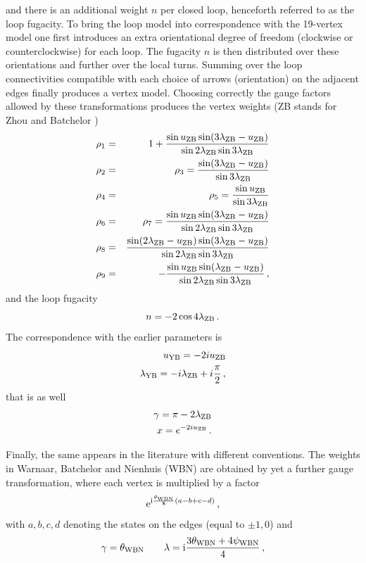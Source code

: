 \documentclass[11pt]{article}
\begin{document}
%
and there is an additional weight $n$ per closed loop, henceforth referred to as the loop fugacity. To bring the loop model into correspondence with the 19-vertex model one first introduces an extra orientational degree of freedom (clockwise or counterclockwise) for each loop. The fugacity $n$ is then distributed over these orientations and further over the local turns. Summing over the loop connectivities compatible with each choice of arrows (orientation) on the adjacent edges finally produces a vertex model. Choosing correctly the gauge factors allowed by these transformations produces the vertex weights (ZB stands for Zhou and Batchelor \cite{Batchelor})
%
\begin{eqnarray}
\rho_1&=&1+{\sin u_{\rm ZB} \sin(3\lambda_{\rm ZB}-u_{\rm ZB})
\over \sin2\lambda_{\rm ZB}\sin3\lambda_{\rm ZB}}\nonumber\\
\rho_2&=&\rho_3={\sin(3\lambda_{\rm ZB}-u_{\rm ZB})\over\sin 3\lambda_{\rm ZB}}\nonumber\\
\rho_4&=&\rho_5={\sin u_{\rm ZB} \over\sin3\lambda_{\rm ZB}}\nonumber\\
\rho_6&=&\rho_7={\sin u_{\rm ZB}\sin(3\lambda_{\rm ZB}-u_{\rm ZB})\over \sin 2\lambda_{\rm ZB}\sin3\lambda_{\rm ZB}}\nonumber\\
\rho_8&=&{\sin(2\lambda_{\rm ZB}-u_{\rm ZB})\sin(3\lambda_{\rm ZB}-u_{\rm ZB})\over \sin 2\lambda_{\rm ZB}\sin3\lambda_{\rm ZB}}\nonumber\\
\rho_9&=&-{\sin u_{\rm ZB}\sin(\lambda_{\rm ZB}-u_{\rm ZB})\over \sin 2\lambda_{\rm ZB}\sin3\lambda_{\rm ZB}} \,,
\label{ZBweights}
\end{eqnarray}
%
and the loop fugacity
%
\begin{equation}
 n=-2\cos4\lambda_{\rm ZB} \,.
\end{equation}
%
The correspondence with the earlier parameters is
%
\begin{eqnarray}
u_{\rm YB}=-2iu_{\rm ZB}\nonumber\\
\lambda_{\rm YB}=-i\lambda_{\rm ZB}+i{\pi\over 2} \,,
\end{eqnarray}
%
that is as well
%
\begin{eqnarray}
\gamma=\pi-2\lambda_{\rm ZB}\nonumber\\
x=e^{-2iu_{\rm ZB}} \,.
\end{eqnarray}
%

Finally, the same  appears in the literature with different conventions. The weights in Warnaar, Batchelor and Nienhuis (WBN) \cite{Nienhuis} are obtained  by yet a further  gauge transformation, where each vertex is multiplied by a factor 
%
\begin{equation}
\mathrm{e}^{\mathrm{i}{\theta_{\rm WBN} \over 8} \left(a-b+c-d\right)}  \,,
\end{equation}
%
with $a,b,c,d$ denoting the states on the edges (equal to $\pm 1,0$) and
%
\begin{equation}
 \gamma = \theta_{\rm WBN} \qquad \lambda = \mathrm{i} {3 \theta_{\rm WBN} + 4 \psi_{\rm WBN} \over 4} \,,
 \label{WBNweights}
\end{equation}
\end{document}
